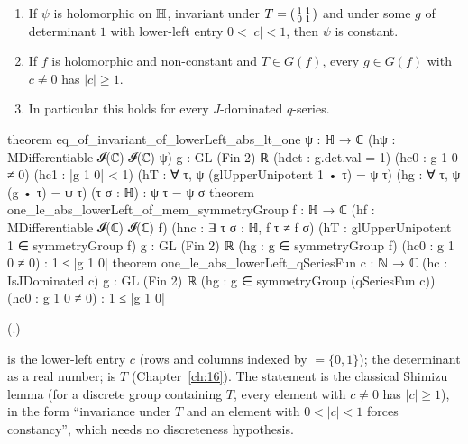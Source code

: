 \begin{theorem}\label{ch19:thm:shimizu}
\begin{enumerate}[label=(\alph*)]
\item If $\psi$ is holomorphic on $\mathbb{H}$, invariant under $T=\left(\begin{smallmatrix}1&1\\0&1\end{smallmatrix}\right)$ and under some $g$ of determinant $1$ with lower-left
  entry $0<|c|<1$, then $\psi$ is constant.
\item If $f$ is holomorphic and non-constant and $T\in G(f)$, every $g\in G(f)$ with $c\ne0$ has $|c|\ge1$.
\item In particular this holds for every $J$-dominated $q$-series.
\end{enumerate}
\end{theorem}
\begin{leancode}
theorem eq_of_invariant_of_lowerLeft_abs_lt_one {ψ : ℍ → ℂ}
    (hψ : MDifferentiable 𝓘(ℂ) 𝓘(ℂ) ψ) {g : GL (Fin 2) ℝ} (hdet : g.det.val = 1)
    (hc0 : g 1 0 ≠ 0) (hc1 : |g 1 0| < 1) (hT : ∀ τ, ψ (glUpperUnipotent 1 • τ) = ψ τ)
    (hg : ∀ τ, ψ (g • τ) = ψ τ) (τ σ : ℍ) : ψ τ = ψ σ
theorem one_le_abs_lowerLeft_of_mem_symmetryGroup {f : ℍ → ℂ}
    (hf : MDifferentiable 𝓘(ℂ) 𝓘(ℂ) f) (hnc : ∃ τ σ : ℍ, f τ ≠ f σ)
    (hT : glUpperUnipotent 1 ∈ symmetryGroup f) {g : GL (Fin 2) ℝ}
    (hg : g ∈ symmetryGroup f) (hc0 : g 1 0 ≠ 0) : 1 ≤ |g 1 0|
theorem one_le_abs_lowerLeft_qSeriesFun {c : ℕ → ℂ} (hc : IsJDominated c) {g : GL (Fin 2) ℝ}
    (hg : g ∈ symmetryGroup (qSeriesFun c)) (hc0 : g 1 0 ≠ 0) : 1 ≤ |g 1 0|
\end{leancode}
(.)
\begin{dictionary}
 is the lower-left entry $c$ (rows and columns indexed by  $=\{0,1\}$);  the determinant as a
real number;  is $T$ (Chapter~\ref{ch:16}).  The statement is the classical Shimizu lemma (for a discrete
group containing $T$, every element with $c\ne0$ has $|c|\ge1$), in the form ``invariance under $T$ and an element with $0<|c|<1$
forces constancy'', which needs no discreteness hypothesis.
\end{dictionary}
